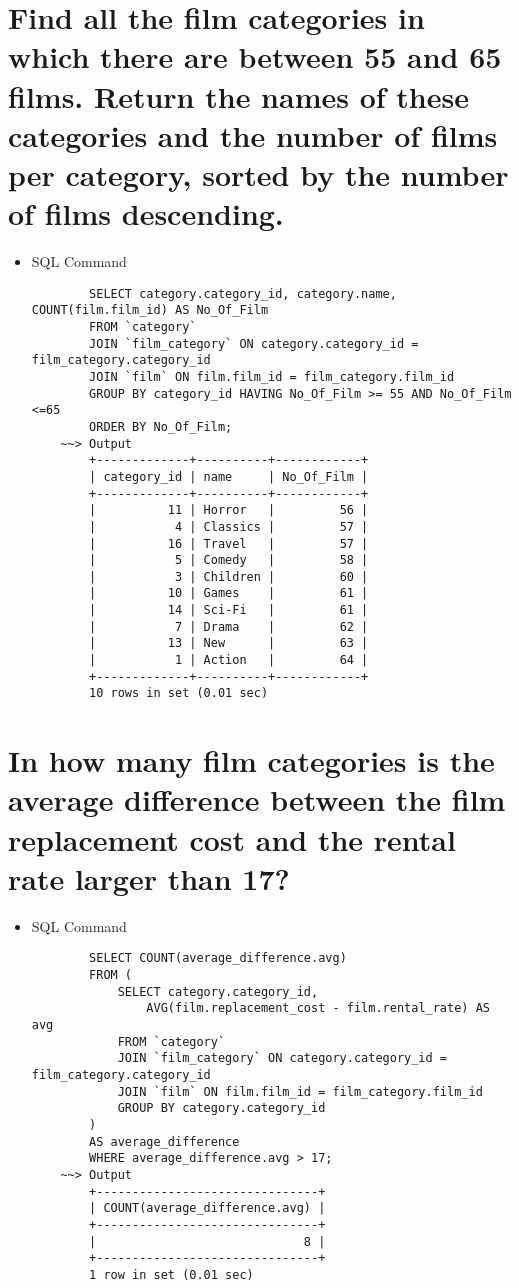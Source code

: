 \documentclass[13pt,a4paper]{report}
\begin{document}
\section{ Find all the film categories in which there are between 55 and 65 films. Return the names of these categories and the number of films per category, sorted by the number of films descending. }

\begin{itemize}
	\item SQL Command
	\begin{lstlisting}
		SELECT category.category_id, category.name, COUNT(film.film_id) AS No_Of_Film
		FROM `category`
		JOIN `film_category` ON category.category_id = film_category.category_id
		JOIN `film` ON film.film_id = film_category.film_id
		GROUP BY category_id HAVING No_Of_Film >= 55 AND No_Of_Film <=65
		ORDER BY No_Of_Film;
	~~> Output
		+-------------+----------+------------+
		| category_id | name     | No_Of_Film |
		+-------------+----------+------------+
		|          11 | Horror   |         56 |
		|           4 | Classics |         57 |
		|          16 | Travel   |         57 |
		|           5 | Comedy   |         58 |
		|           3 | Children |         60 |
		|          10 | Games    |         61 |
		|          14 | Sci-Fi   |         61 |
		|           7 | Drama    |         62 |
		|          13 | New      |         63 |
		|           1 | Action   |         64 |
		+-------------+----------+------------+
		10 rows in set (0.01 sec)

	\end{lstlisting}
\end{itemize}

\section{ In how many film categories is the average difference between the film replacement cost and the rental rate larger than 17? }

\begin{itemize}
First, find the average difference between the film replacement cost and the rental rate of in each category.
Then, count the number of film categories which have the average larger than 17
\item SQL Command
	\begin{lstlisting}
		SELECT COUNT(average_difference.avg) 
		FROM (
			SELECT category.category_id, 
				AVG(film.replacement_cost - film.rental_rate) AS avg
			FROM `category`
			JOIN `film_category` ON category.category_id = film_category.category_id
			JOIN `film` ON film.film_id = film_category.film_id
			GROUP BY category.category_id
		)
		AS average_difference 
		WHERE average_difference.avg > 17;
	~~> Output
		+-------------------------------+
		| COUNT(average_difference.avg) |
		+-------------------------------+
		|                             8 |
		+-------------------------------+
		1 row in set (0.01 sec)


	\end{lstlisting}
\end{itemize}
\end{document}
